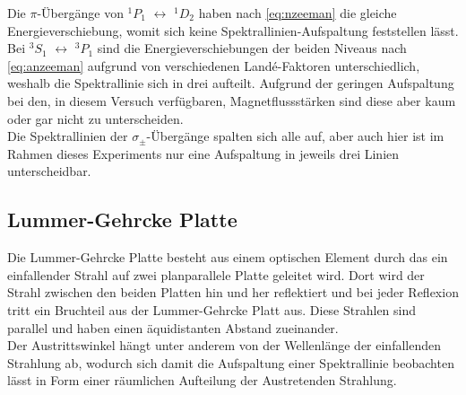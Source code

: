 Die $\pi$-Übergänge von $^1P_1$ $\leftrightarrow$ $^1D_2$ haben nach \autoref{eq:nzeeman} die gleiche Energieverschiebung, womit sich keine Spektrallinien-Aufspaltung feststellen lässt.
Bei $^3S_1$ $\leftrightarrow$ $^3P_1$ sind die Energieverschiebungen der beiden Niveaus nach \autoref{eq:anzeeman} aufgrund von verschiedenen Landé-Faktoren unterschiedlich, weshalb die Spektrallinie sich in drei aufteilt. Aufgrund der geringen Aufspaltung bei den, in diesem Versuch verfügbaren, Magnetflussstärken sind diese aber kaum oder gar nicht zu unterscheiden.\\
Die Spektrallinien der $\sigma_\pm$-Übergänge spalten sich alle auf, aber auch hier ist im Rahmen dieses Experiments nur eine Aufspaltung in jeweils drei Linien unterscheidbar.



\subsection{Lummer-Gehrcke Platte}
\label{sec:lgplatte}

Die Lummer-Gehrcke Platte besteht aus einem optischen Element durch das ein einfallender Strahl auf zwei planparallele Platte geleitet wird. Dort wird der Strahl zwischen den beiden Platten hin und her reflektiert und bei jeder Reflexion tritt ein Bruchteil aus der Lummer-Gehrcke Platt aus. Diese Strahlen sind parallel und haben einen äquidistanten Abstand zueinander.\\
Der Austrittswinkel hängt unter anderem von der Wellenlänge der einfallenden Strahlung ab, wodurch sich damit die Aufspaltung einer Spektrallinie beobachten lässt in Form einer räumlichen Aufteilung der Austretenden Strahlung.

























